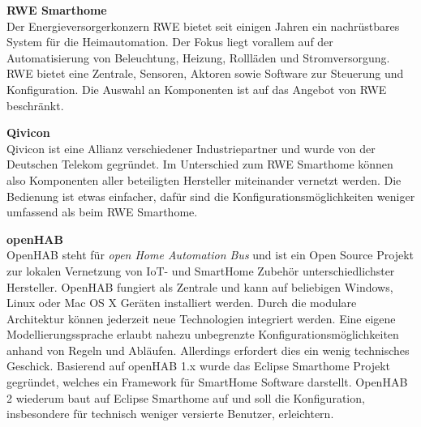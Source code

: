 \textbf{RWE Smarthome} \\
Der Energieversorgerkonzern RWE bietet seit einigen Jahren ein nachrüstbares System für die Heimautomation. Der Fokus liegt vorallem auf der Automatisierung von Beleuchtung, Heizung, Rollläden und Stromversorgung. RWE bietet eine Zentrale, Sensoren, Aktoren sowie Software zur Steuerung und Konfiguration. Die Auswahl an Komponenten ist auf das Angebot von RWE beschränkt.

\textbf{Qivicon} \\
Qivicon ist eine Allianz verschiedener Industriepartner und wurde von der Deutschen Telekom gegründet. Im Unterschied zum RWE Smarthome können also Komponenten aller beteiligten Hersteller miteinander vernetzt werden. Die Bedienung ist etwas einfacher, dafür sind die Konfigurationsmöglichkeiten weniger umfassend als beim RWE Smarthome.

\textbf{openHAB} \\
OpenHAB steht für \textit{open Home Automation Bus} und ist ein Open Source Projekt zur lokalen Vernetzung von IoT- und SmartHome Zubehör unterschiedlichster Hersteller. OpenHAB fungiert als Zentrale und kann auf beliebigen Windows, Linux oder Mac OS X Geräten installiert werden. Durch die modulare Architektur können jederzeit neue Technologien integriert werden. Eine eigene Modellierungssprache erlaubt nahezu unbegrenzte Konfigurationsmöglichkeiten anhand von Regeln und Abläufen. Allerdings erfordert dies ein wenig technisches Geschick. Basierend auf openHAB 1.x wurde das Eclipse Smarthome Projekt gegründet, welches ein Framework für SmartHome Software darstellt. OpenHAB 2 wiederum baut auf Eclipse Smarthome auf und soll die Konfiguration, insbesondere für technisch weniger versierte Benutzer, erleichtern.
